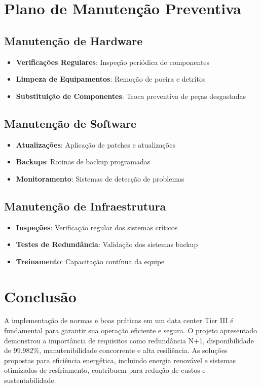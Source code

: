 \documentclass[
	12pt,				%
	oneside,			%
	a4paper,			%
	english,			%
	brazil				%
	]{abntex2unama}
\begin{document}
\chapter{Plano de Manutenção Preventiva}

\section{Manutenção de Hardware}
\begin{itemize}
	\item \textbf{Verificações Regulares}: Inspeção periódica de componentes
	\item \textbf{Limpeza de Equipamentos}: Remoção de poeira e detritos
	\item \textbf{Substituição de Componentes}: Troca preventiva de peças desgastadas
\end{itemize}

\section{Manutenção de Software}
\begin{itemize}
	\item \textbf{Atualizações}: Aplicação de patches e atualizações
	\item \textbf{Backups}: Rotinas de backup programadas
	\item \textbf{Monitoramento}: Sistemas de detecção de problemas
\end{itemize}

\section{Manutenção de Infraestrutura}
\begin{itemize}
	\item \textbf{Inspeções}: Verificação regular dos sistemas críticos
	\item \textbf{Testes de Redundância}: Validação dos sistemas backup
	\item \textbf{Treinamento}: Capacitação contínua da equipe
\end{itemize}

\chapter{Conclusão}
A implementação de normas e boas práticas em um data center Tier III é fundamental para garantir sua operação eficiente e segura. O projeto apresentado demonstrou a importância de requisitos como redundância N+1, disponibilidade de 99.982\%, manutenibilidade concorrente e alta resiliência. As soluções propostas para eficiência energética, incluindo energia renovável e sistemas otimizados de resfriamento, contribuem para redução de custos e sustentabilidade.
\end{document}
